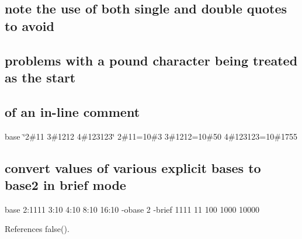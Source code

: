 \subsection*{note the use of both single and double quotes to avoid}

\subsection*{problems with a pound character being treated as the start}

\subsection*{of an in-\/line comment}

base \textquotesingle{}\char`\"{}2\#11 3\#1212 4\#123123\char`\"{}\textquotesingle{} 2\#11=10\#3 3\#1212=10\#50 4\#123123=10\#1755

\subsection*{convert values of various explicit bases to base2 in brief mode}

base 2\+:1111 3\+:10 4\+:10 8\+:10 16\+:10 -\/obase 2 -\/brief 1111 11 100 1000 10000 

References false().

